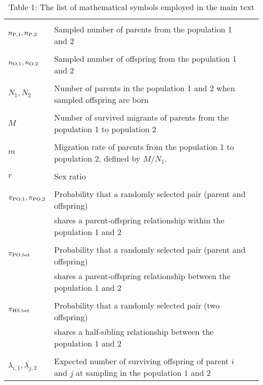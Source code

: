 \documentclass[12pt, English]{article}
\begin{document}
\begin{spacing}{1.9}
\renewcommand{\arraystretch}{0.6}
\begin{table}[tb]
   \caption[]{Table 1: The list of mathematical symbols employed in the main text}
    \textbf {}\\[-4mm]
    \begin{tabular}{llc} \hline
       & & \\
	$n_{\rm P,1}, n_{\rm P, 2}$			& Sampled number of parents from the population 1 and 2\\ 
		                						& \\
	$n_{\rm O, 1}, n_{\rm O, 2}$			& Sampled number of offspring from the population 1 and 2\\ 
		                						& \\
	$N_{1}, N_{2}$						& Number of parents in the population 1 and 2 when sampled offspring are born\\
		                						& \\
	$M$								& Number of survived migrants of parents from the population 1 to population 2\\
		                						& \\
	$m$								& Migration rate of parents from the population 1 to population 2, defined by $M/N_1$.\\
		                						& \\
	$r$								& Sex ratio\\
		                						& \\
	$\pi_{\rm PO,1}, \pi_{\rm PO,2}$		& Probability that a randomly selected pair (parent and offspring) \\
	                							& shares a parent-offspring relationship within the population 1 and 2\\
									& \\
	$\pi_{\rm PO, bet}$					& Probability that a randomly selected pair (parent and offspring) \\
	                							& shares a parent-offspring relationship between the population 1 and 2\\
									& \\
	$\pi_{\rm HS, bet}$					& Probability that a randomly selected pair (two offspring) \\
	                							& shares a half-sibling relationship between the population 1 and 2\\
					                			& \\
	$\lambda_{i,1}, \lambda_{j,2}$			& Expected number of surviving offspring of parent $i$ and $j$ at sampling in the population 1 and 2\\

\end{tabular}
\end{table}
\end{spacing}
\end{document}
